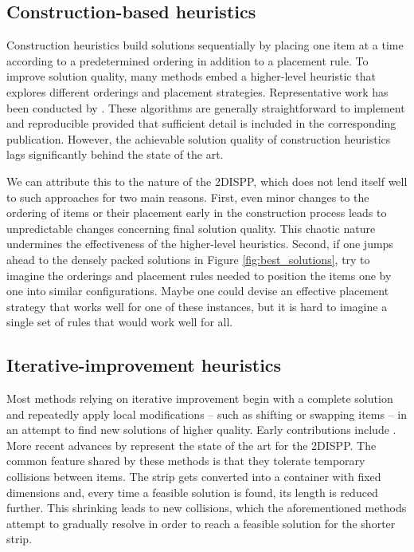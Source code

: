 \documentclass[preprint, 11pt, authoryear]{elsarticle}
\begin{document}
\subsection*{Construction-based heuristics}
Construction heuristics build solutions sequentially by placing one item at a time according to a predetermined ordering in addition to a placement rule. 
To improve solution quality, many methods embed a higher-level heuristic that explores different orderings and placement strategies. 
Representative work has been conducted by \citet{oliveira2000topos, gomes2002two, burke2006new, bennell2010beam, amaro2017parallel}.
These algorithms are generally straightforward to implement and reproducible provided that sufficient detail is included in the corresponding publication.
However, the achievable solution quality of construction heuristics lags significantly behind the state of the art.

We can attribute this to the nature of the 2DISPP, which does not lend itself well to such approaches for two main reasons.
First, even minor changes to the ordering of items or their placement early in the construction process leads to unpredictable changes concerning final solution quality.
This chaotic nature undermines the effectiveness of the higher-level heuristics.
Second, if one jumps ahead to the densely packed solutions in Figure \ref{fig:best_solutions}, try to imagine the orderings and placement rules needed to position the items one by one into similar configurations.
Maybe one could devise an effective placement strategy that works well for one of these instances, but it is hard to imagine a single set of rules that would work well for all.

\subsection*{Iterative-improvement heuristics}
Most methods relying on iterative improvement begin with a complete solution and repeatedly apply local modifications -- such as shifting or swapping items -- in an attempt to find new solutions of higher quality.
Early contributions include \citet{egeblad2007fast, umetani2009solving, leung2012extended}. 
More recent advances by \citet{elkeran2013new, wang2017flexible, sato2019raster} represent the state of the art for the 2DISPP.
The common feature shared by these methods is that they tolerate temporary collisions between items.
The strip gets converted into a container with fixed dimensions and, every time a feasible solution is found, its length is reduced further.
This shrinking leads to new collisions, which the aforementioned methods attempt to gradually resolve in order to reach a feasible solution for the shorter strip.
\end{document}
